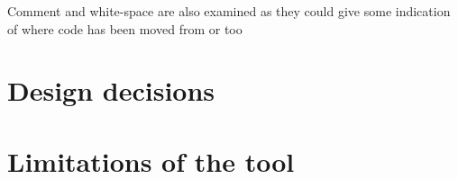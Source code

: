 Comment and white-space are also examined as they could give some indication of where code has been moved from or too

 
\section{Design decisions}
% 
% 
% 
\section{Limitations of the tool}


 







